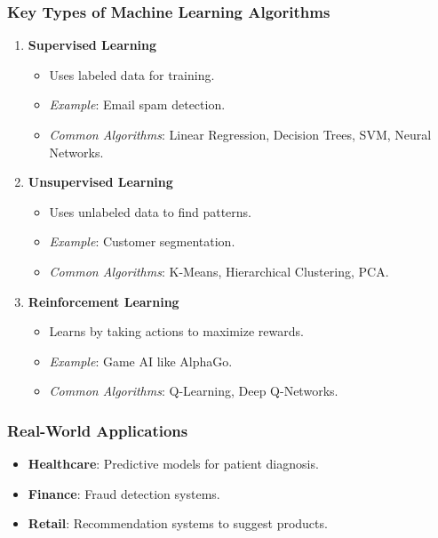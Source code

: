 \documentclass[aspectratio=169]{beamer}
\begin{document}
\begin{frame}[fragile]
    \frametitle{Key Types of Machine Learning Algorithms}
    \begin{enumerate}
        \item \textbf{Supervised Learning}
            \begin{itemize}
                \item Uses labeled data for training.
                \item \textit{Example}: Email spam detection.
                \item \textit{Common Algorithms}: Linear Regression, Decision Trees, SVM, Neural Networks.
            \end{itemize}
        
        \item \textbf{Unsupervised Learning}
            \begin{itemize}
                \item Uses unlabeled data to find patterns.
                \item \textit{Example}: Customer segmentation.
                \item \textit{Common Algorithms}: K-Means, Hierarchical Clustering, PCA.
            \end{itemize}
        
        \item \textbf{Reinforcement Learning}
            \begin{itemize}
                \item Learns by taking actions to maximize rewards.
                \item \textit{Example}: Game AI like AlphaGo.
                \item \textit{Common Algorithms}: Q-Learning, Deep Q-Networks.
            \end{itemize}
    \end{enumerate}
\end{frame}

\begin{frame}[fragile]
    \frametitle{Real-World Applications}
    \begin{itemize}
        \item \textbf{Healthcare}: Predictive models for patient diagnosis.
        \item \textbf{Finance}: Fraud detection systems.
        \item \textbf{Retail}: Recommendation systems to suggest products.
    \end{itemize}
\end{frame}
\end{document}
